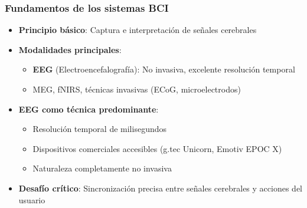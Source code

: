 \documentclass[10pt,thmsa]{beamer}
\theoremstyle{plain}
\begin{document}
\begin{frame}
\frametitle{Fundamentos de los sistemas BCI}

\begin{itemize}
\item \textbf{Principio básico}: Captura e interpretación de señales cerebrales
\vspace{0.5em}
\item \textbf{Modalidades principales}:
      \begin{itemize}
      \item \textbf{EEG} (Electroencefalografía): No invasiva, excelente resolución temporal
      \item MEG, fNIRS, técnicas invasivas (ECoG, microelectrodos)
      \end{itemize}
\vspace{0.5em}
\item \textbf{EEG como técnica predominante}:
      \begin{itemize}
      \item Resolución temporal de milisegundos
      \item Dispositivos comerciales accesibles (g.tec Unicorn, Emotiv EPOC X)
      \item Naturaleza completamente no invasiva
      \end{itemize}
\vspace{0.5em}
\item \textbf{Desafío crítico}: Sincronización precisa entre señales cerebrales y acciones del usuario
\end{itemize}

\end{frame}
\end{document}
